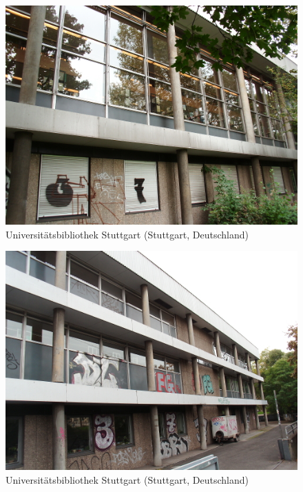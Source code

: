\documentclass[a4paper,
fontsize=11pt,
oneside,
numbers=noperiodatend,
parskip=half-,
bibliography=totoc,
final
]{scrartcl}
\begin{document}
\begin{figure}[htbp]
\centering
\includegraphics{./img/033.jpg}
\caption{Universitätsbibliothek Stuttgart (Stuttgart,
Deutschland)}
\end{figure}

\begin{figure}[htbp]
\centering
\includegraphics{./img/034.jpg}
\caption{Universitätsbibliothek Stuttgart (Stuttgart,
Deutschland)}
\end{figure}
\end{document}
